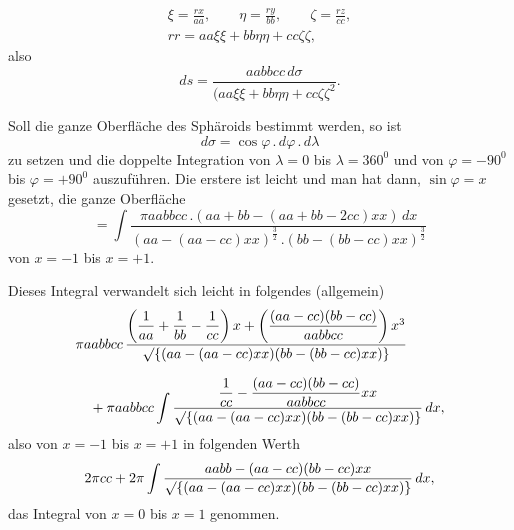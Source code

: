 %
\[
\begin{gathered}
\xi=\frac{rx}{aa},\qquad\eta=\frac{ry}{bb},\qquad\zeta=\frac{rz}{cc},\\[4pt]
rr=aa\xi\xi+bb\eta\eta+cc\zeta\zeta,
\end{gathered}
\]
also
\[
ds=\frac{aabbcc\,d\sigma}{{(aa\xi\xi+bb\eta\eta+cc\zeta\zeta}^{2}}.
\]

Soll die ganze Oberfläche des Sphäroids bestimmt werden, so ist
\[
d\sigma=\cos\varphi\,.\,d\varphi\,.\,d\lambda
\]
zu setzen und die doppelte Integration von $\lambda=0$ bis $\lambda=360^0$ und von $\varphi=-90^0$ bis $\varphi=+90^0$ auszuführen. Die erstere ist leicht und man hat dann, $\sin\varphi=x$ gesetzt, die ganze Oberfläche
\[
=\int\frac{\pi aabbcc\,.(aa+bb-(aa+bb-2cc)xx)\,dx}{(aa-(aa-cc)xx)^{\frac32}\,.(bb-(bb-cc)xx)^{\frac32}}
\]
von $x=-1$ bis $x=+1$.

Dieses Integral verwandelt sich leicht in folgendes (allgemein)
\[
\begin{aligned}
&\pi aabbcc\,\frac{\left(\dfrac1{aa}+\dfrac1{bb}-\dfrac1{cc}\right)x+\left(\dfrac{(aa-cc)(bb-cc)}{aabbcc}\right)x^3}{\mathord{\surd}\{(aa-(aa-cc)xx)(bb-(bb-cc)xx)\}}\\[7pt]
&\quad+\pi aabbcc\int\frac{\dfrac1{cc}-\dfrac{(aa-cc)(bb-cc)}{aabbcc}xx}{\mathord{\surd}\{(aa-(aa-cc)xx)(bb-(bb-cc)xx)\}}\,dx,
\end{aligned}
\]
also von $x=-1$ bis $x=+1$ in folgenden Werth
\[
2\pi cc+2\pi\int\frac{aabb-(aa-cc)(bb-cc)xx}{\mathord{\surd}\{(aa-(aa-cc)xx)(bb-(bb-cc)xx)\}}\,dx,
\]
das Integral von $x=0$ bis $x=1$ genommen.
